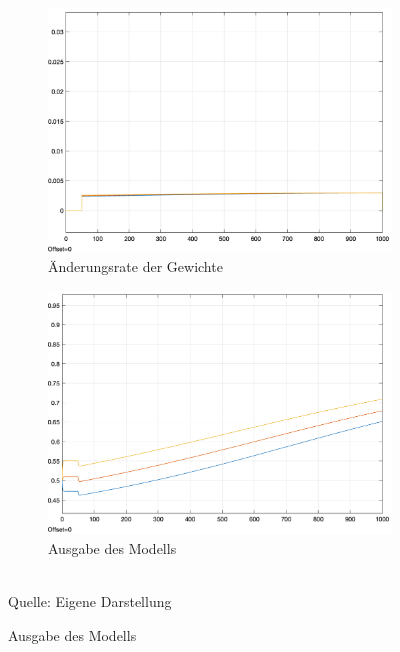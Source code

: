 \begin{figure}[h]
  \caption{Auswirkungen einer nicht-negativen Aktivierungsfunktion auf das \ac{c-ep}}
  \centering
  \begin{subfigure}[b]{0.5\textwidth}
    \includegraphics[width=\textwidth]{abbildungen/c_ep_non_negative_activation_weight_update.png}
    \caption{Änderungsrate der Gewichte}
  \end{subfigure}%
  \hfill
  \begin{subfigure}[b]{0.5\textwidth}
    \includegraphics[width=\textwidth]{abbildungen/c_ep_non_negative_activation_ausgabe.png}
    \caption{Ausgabe des Modells}
  \end{subfigure}
  \\
  Quelle: Eigene Darstellung
  \label{fig:C-EP Non-Negative Aktivierungsfunktion}
\end{figure}

